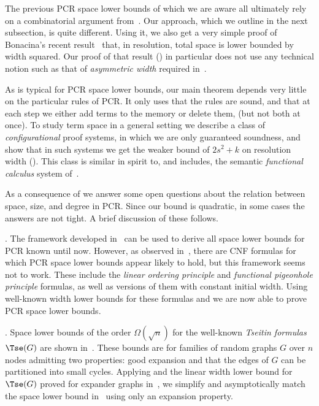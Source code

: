 \documentclass{toc}
\begin{document}
The previous PCR space lower bounds of which we are aware
all ultimately rely on a combinatorial argument from~\cite{ABRW}. 
Our approach, which we outline in the next subsection,
is quite different.
Using it, we also get a very simple proof of Bonacina's recent 
result~\cite{DBLP:conf/icalp/Bonacina16} that, in resolution, total space is lower bounded by width squared.  Our proof of that result () in particular
does not use any technical notion such as that of \emph{asymmetric width} required 
in~\cite{DBLP:conf/icalp/Bonacina16}.

As is typical for PCR space lower bounds, our main theorem depends very little
on the particular rules of PCR. It only uses that the rules are sound, and 
that at each step we either add terms to the memory or delete them,
(but not both at once). 
To study term space in a general setting we
describe a class of \emph{configurational} proof systems,
in which we are only guaranteed soundness,
and show that in such systems we get the weaker bound of $2s^2+k$
on resolution width ().
This class is similar in spirit to, and includes, the semantic
\emph{functional calculus} system of~\cite{ABRW}.
     
As a consequence of  we answer 
some open questions about the relation between space, size, and degree in PCR. Since our bound is quadratic, 
in some cases the answers are not tight. A brief discussion of these follows.

\smallskip 
{}.
The framework developed in~\cite{DBLP:journals/jacm/BonacinaG15} can be used to derive all space lower bounds for PCR known until now. 
However, as observed in~\cite{DBLP:conf/icalp/FilmusLMNV13}, there are CNF formulas 
for which PCR space lower bounds appear likely to hold, 
but this framework seems not to work.  
These include the \emph{linear ordering principle}
and \emph{functional pigeonhole principle} formulas, as well as
versions of them  with constant initial width.  Using well-known width lower bounds for these formulas \cite{DBLP:journals/cc/BonetG01,DBLP:journals/tocl/GalesiL10,DBLP:journals/tcs/Razborov03,DBLP:journals/siamcomp/SegerlindBI04,DBLP:conf/coco/MiksaN15}  and  we are 
now able to prove PCR space lower bounds. 

\smallskip 
{}.
Space lower bounds of the order $\Omega(\sqrt{n})$ for the well-known \emph{Tseitin formulas} $\Tse(G)$ are shown
in~\cite{DBLP:conf/icalp/FilmusLMNV13}. These bounds are for families of random graphs $G$ over $n$
nodes admitting two properties:  good expansion and that the edges of $G$  can be partitioned into small cycles. Applying  and the linear width lower bound  for $\Tse(G)$ proved for expander graphs in~\cite{DBLP:journals/jacm/Ben-SassonW01}, we simplify and asymptotically match the space lower bound in~\cite{DBLP:conf/icalp/FilmusLMNV13} using only an
expansion property.
 
\end{document}
